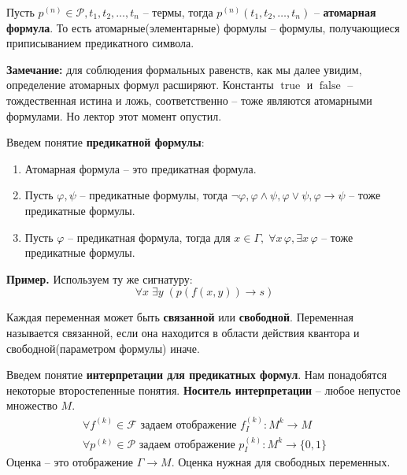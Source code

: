 \begin{conj}
    Пусть $p^{(n)} \in \mathcal{P}, t_1, t_2, \dots, t_n$ -- термы, тогда 
    $p^{(n)} (t_1, t_2, \dots, t_n)$ -- \textbf{атомарная формула}. То есть атомарные(элементарные) формулы -- формулы, получающиеся
    приписыванием предикатного символа.  
\end{conj}
\textbf{Замечание: } для соблюдения формальных равенств, как мы далее увидим, определение атомарных формул расширяют. Константы $\operatorname{true}$ и $\operatorname{false}$ -- тождественная истина и ложь, соответственно -- тоже являются атомарными формулами. Но лектор этот момент опустил.

\begin{conj}
    Введем понятие \textbf{предикатной формулы}:
    \begin{enumerate}
        \item Атомарная формула -- это предикатная формула.
        \item Пусть $\varphi, \psi$ -- предикатные формулы, тогда $\lnot \varphi, \varphi \land \psi, \varphi \lor \psi, \varphi \to \psi$ -- тоже предикатные формулы. 
        \item Пусть $\varphi$ -- предикатная формула, тогда для $x \in \Gamma, \; \forall x \, \varphi, \exists x \, \varphi$ -- тоже предикатные формулы.  
    \end{enumerate} 
\end{conj}

\textbf{Пример.} Используем ту же сигнатуру: \[ \forall x \; \exists y \; (p(f(x, y)) \to s) \]

\vspace{3mm}

\begin{conj}
    Каждая переменная может быть \textbf{связанной} или \textbf{свободной}. Переменная называется связанной, если она находится в области действия квантора и свободной(параметром формулы) иначе.
\end{conj}

\begin{conj}
    Введем понятие \textbf{интерпретации для предикатных формул}. Нам понадобятся некоторые 
    второстепенные понятия. 
    \textbf{Носитель интерпретации} -- любое непустое множество $M$.
    \begin{gather*}
        \forall f^{(k)} \in \mathcal{F} \text{ задаем отображение } f^{(k)}_I: M^k \longrightarrow M \\
        \forall p^{(k)} \in \mathcal{P} \text{ задаем отображение } p^{(k)}_I: M^k \longrightarrow \{0, 1\}
    \end{gather*}
    Оценка -- это отображение $\Gamma \longrightarrow M$. Оценка нужная для свободных переменных.
\end{conj}

